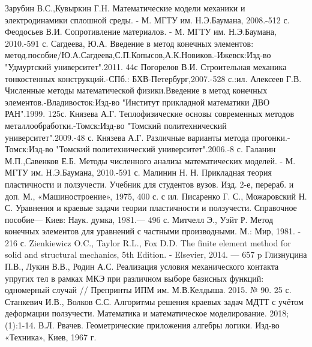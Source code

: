 \documentclass[a4paper,14pt]{extarticle}
\renewcommand{\refname}{whatever}
\begin{document}
\renewcommand{\refname}{\centering\textbf\selectfont\large СПИСОК ИСПОЛЬЗОВАННЫХ ИСТОЧНИКОВ} 
\newpage
{}
\begin{thebibliography}{6}
  Зарубин В.С.,Кувыркин Г.Н. Математические модели механики и электродинамики сплошной среды. - М. МГТУ им. Н.Э.Баумана, 2008.-512 с.
  Феодосьев В.И. Сопротивление материалов. - М. МГТУ им. Н.Э.Баумана, 2010.-591 с.
  Сагдеева, Ю.А. Введение в метод конечных элементов: метод.пособие/Ю.А.Сагдеева,С.П.Копысов,А.К.Новиков.-Ижевск:Изд-во "Удмуртский университет".2011. 44с
  Погорелов В.И. Строительная механика тонкостенных конструкций.-СПб.: БХВ-Петербург,2007.-528 с.:ил.
  Алексеев Г.В. Численные методы математической физики.Введение в метод конечных элементов.-Владивосток:Изд-во "Институт прикладной математики ДВО РАН".1999. 125с.
  Князева А.Г. Теплофизические основы современных методов металлообработки.-Томск:Изд-во "Томский политехнический университет".2009.-48 с.
  Князева А.Г. Различные варианты метода прогонки.-Томск:Изд-во "Томский политехнический университет".2006.-8 с.
  Галанин М.П.,Савенков Е.Б. Методы численного анализа математических моделей. - М. МГТУ им. Н.Э.Баумана, 2010.-591 с.
  Малинин Н. Н. Прикладная теория пластичности и ползучести. Учебник для студентов вузов. Изд. 2-е, перераб. и доп. М., «Машиностроение», 1975, 400 с. с ил.
 Писаренко Г. С., Можаровский Н. С. Уравнения и краевые задачи теории пластичности и ползучести. Справочное пособие— Киев: Наук. думка, 1981.— 496 с.
 Митчелл Э., Уэйт Р. Метод конечных элементов для уравнений с частными производными. М.: Мир, 1981. - 216 с.
 Zienkiewicz O.C., Taylor R.L., Fox D.D. The finite element method for solid and structural mechanics, 5th Edition. - Elsevier, 2014. — 657 p
 Глизнуцина П.В., Лукин В.В., Родин А.С. Реализация условия механического контакта упругих тел в рамках МКЭ при различном выборе базисных функций: одномерный случай // Препринты ИПМ им. М.В.Келдыша. 2015. № 90. 25 с.
 Станкевич И.В., Волков С.С. Алгоритмы решения краевых задач МДТТ с учётом деформации ползучести. Математика и математическое моделирование. 2018;(1):1-14.
 В.Л. Рвачев. Геометрические приложения алгебры логики. Изд-во «Техника», Киев, 1967 г.

\end{thebibliography}
\end{document}

